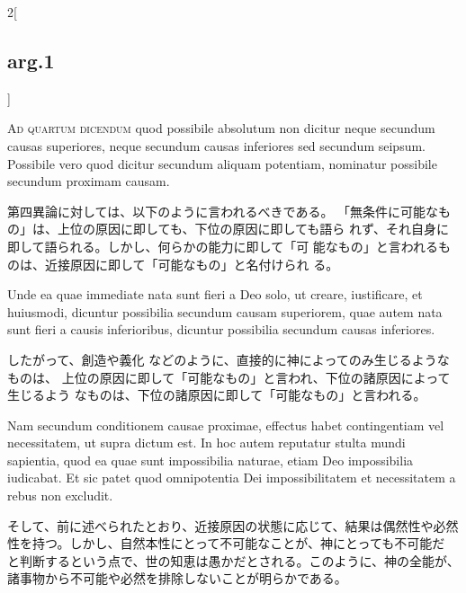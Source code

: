 \documentclass[paper=a4paper,fontsize=10pt,jafontsize=9pt,titlepage]{jlreq}
\begin{document}
\begin{paracol}{2}[\subsection{arg.1}]
\switchcolumn*[\subsection{ad.4}]

{\scshape Ad quartum dicendum} quod possibile absolutum
non dicitur neque secundum causas superiores, neque secundum causas
inferiores sed secundum seipsum. Possibile vero quod dicitur secundum
aliquam potentiam, nominatur possibile secundum proximam causam.

\switchcolumn

第四異論に対しては、以下のように言われるべきである。
「無条件に可能なもの」は、上位の原因に即しても、下位の原因に即しても語ら
 れず、それ自身に即して語られる。しかし、何らかの能力に即して「可
 能なもの」と言われるものは、近接原因に即して「可能なもの」と名付けられ
 る。

\switchcolumn*

Unde ea
quae immediate nata sunt fieri a Deo solo, ut creare, iustificare, et
huiusmodi, dicuntur possibilia secundum causam superiorem, quae autem
nata sunt fieri a causis inferioribus, dicuntur possibilia secundum
causas inferiores.

\switchcolumn

したがって、創造や義化
などのように、直接的に神によってのみ生じるようなものは、
上位の原因に即して「可能なもの」と言われ、下位の諸原因によって生じるよう
 なものは、下位の諸原因に即して「可能なもの」と言われる。

\switchcolumn*

Nam secundum conditionem causae proximae, effectus
habet contingentiam vel necessitatem, ut supra dictum est. In hoc autem
reputatur stulta mundi sapientia, quod ea quae sunt impossibilia
naturae, etiam Deo impossibilia iudicabat. Et sic patet quod
omnipotentia Dei impossibilitatem et necessitatem a rebus non excludit.

\switchcolumn

そして、前に述べられたとおり、近接原因の状態に応じて、結果は偶然性や必然
 性を持つ。しかし、自然本性にとって不可能なことが、神にとっても不可能だ
 と判断するという点で、世の知恵は愚かだとされる。このように、神の全能が、
 諸事物から不可能や必然を排除しないことが明らかである。

\end{paracol}
\newpage
{}
{}
\setcounter{section}{4}
\setcounter{subsection}{0}
\end{document}
